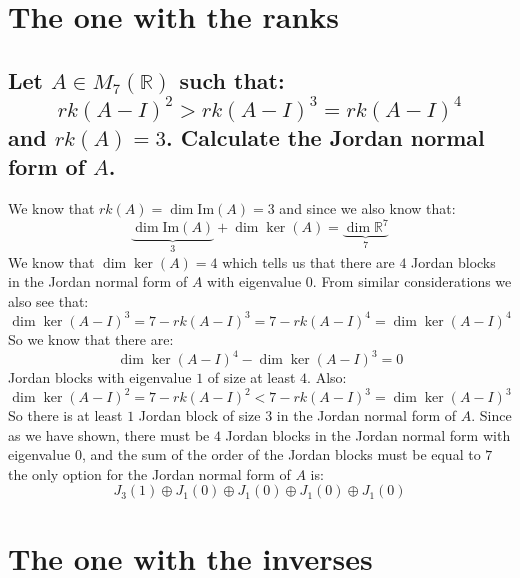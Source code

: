 \documentclass[11pt,a4paper]{article}
\theoremstyle{plain}
\renewcommand{\Im}{\text{Im}}
\newcommand{\R}{\mathbb{R}}
\begin{document}
	\newpage

	\section{The one with the ranks}
	\subsection{Let $A\in M_7(\R)$ such that:
	\[
		rk(A-I)^2 > rk(A-I)^3 = rk(A-I)^4
	\] and $rk(A)=3$. Calculate the Jordan normal form of $A$.}
	We know that $rk(A)=\dim\Im(A) = 3$ and since we also know that:
	\[
		\underbrace{\dim\Im(A)}_3 + \dim\ker(A) = \underbrace{\dim \R^7}_7
	\]
	We know that $\dim\ker(A) = 4$ which tells us that there are $4$ Jordan blocks
	in the Jordan normal form of $A$ with eigenvalue $0$. From similar 
	considerations we also see that:
	\[
		\dim\ker(A-I)^3 = 7 - rk(A-I)^3 = 7 - rk(A-I)^4 = \dim\ker(A-I)^4
	\]
	So we know that there are:
	\[ \dim\ker(A-I)^4 - \dim\ker(A-I)^3 = 0 \]
	Jordan blocks with eigenvalue $1$ of size at least $4$. Also:
	\[
		\dim\ker(A-I)^2 = 7 - rk(A-I)^2 < 7 - rk(A-I)^3 = \dim\ker(A-I)^3
	\]
	So there is at least $1$ Jordan block of size $3$ in the Jordan normal form 
	of $A$. Since as we have shown, there must be $4$ Jordan blocks in the Jordan
	normal form with eigenvalue $0$, and the sum of the order of the Jordan blocks
	must be equal to $7$ the only option for the Jordan normal form of $A$ is:
	\[
		J_3(1) \oplus J_1(0) \oplus J_1(0) \oplus J_1(0) \oplus J_1(0)
	\]  

	\newpage

	\section{The one with the inverses}
\end{document}

